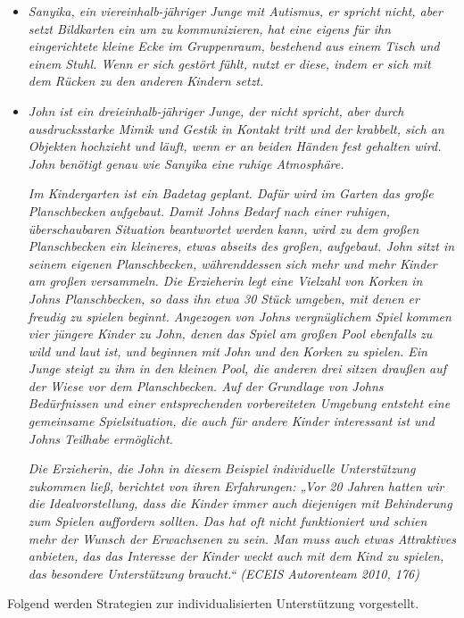 \begin{itemize}
\item \emph{Sanyika, ein viereinhalb-jähriger Junge mit Autismus, er spricht nicht, aber setzt Bildkarten ein um zu kommunizieren, hat eine eigens für ihn eingerichtete kleine Ecke im Gruppenraum, bestehend aus einem Tisch und einem Stuhl. Wenn er sich gestört fühlt, nutzt er diese, indem er sich mit dem Rücken zu den anderen Kindern setzt.} 

\item \emph{John ist ein dreieinhalb-jähriger Junge, der nicht spricht, aber durch ausdrucksstarke Mimik und Gestik in Kontakt tritt und der krabbelt, sich an Objekten hochzieht und läuft, wenn er an beiden Händen fest gehalten wird. John benötigt genau wie Sanyika eine ruhige Atmosphäre.} 

\emph{Im Kindergarten ist ein Badetag geplant. Dafür wird im Garten das große Planschbecken aufgebaut. Damit Johns Bedarf nach einer ruhigen, überschaubaren Situation beantwortet werden kann, wird zu dem großen Planschbecken ein kleineres, etwas abseits des großen, aufgebaut. John sitzt in seinem eigenen Planschbecken, währenddessen sich mehr und mehr Kinder am großen versammeln. Die Erzieherin legt eine Vielzahl von Korken in Johns Planschbecken, so dass ihn etwa 30 Stück umgeben, mit denen er freudig zu spielen beginnt. Angezogen von Johns vergnüglichem Spiel kommen vier jüngere Kinder zu John, denen das Spiel am großen Pool ebenfalls zu wild und laut ist, und beginnen mit John und den Korken zu spielen. Ein Junge steigt zu ihm in den kleinen Pool, die anderen drei sitzen draußen auf der Wiese vor dem Planschbecken. 
Auf der Grundlage von Johns Bedürfnissen und einer entsprechenden vorbereiteten Umgebung entsteht eine gemeinsame Spielsituation, die auch für andere Kinder interessant ist und Johns Teilhabe ermöglicht.}

\emph{Die Erzieherin, die John in diesem Beispiel individuelle Unterstützung zukommen ließ, berichtet von ihren Erfahrungen: „Vor 20 Jahren hatten wir die Idealvorstellung, dass die Kinder immer auch diejenigen mit Behinderung zum Spielen auffordern sollten. Das hat oft nicht funktioniert und schien mehr der Wunsch der Erwachsenen zu sein. Man muss auch etwas Attraktives anbieten, das das Interesse der Kinder weckt auch mit dem Kind zu spielen, das besondere Unterstützung braucht.“ (ECEIS Autorenteam 2010, 176)}
\end{itemize}

Folgend werden Strategien zur individualisierten Unterstützung vorgestellt.
 
